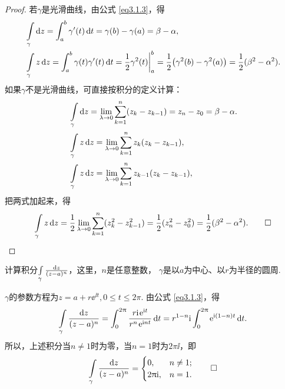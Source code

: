 \begin{proof}
  若$\gamma$是光滑曲线，由公式 \eqref{eq3.1.3}，得
  \begin{align*}
    & \int\limits_\gamma \mathop{}\!\mathrm dz = \int_a^b\gamma'(t)\mathop{}\!\mathrm{d} t=\gamma(b)-\gamma(a)=\beta-\alpha,\\
    & \int\limits_\gamma z\mathop{}\!\mathrm dz = \int_a^b\gamma(t)\gamma'(t)\mathop{}\!\mathrm{d} t
      = \frac12\gamma^2(t)\bigg|_a^b = \frac12\big(\gamma^2(b)-\gamma^2(a)\big)
      = \frac12(\beta^2-\alpha^2).
  \end{align*}
  如果$\gamma$不是光滑曲线，可直接按积分的定义计算：
  \begin{align*}
  &\int\limits_\gamma\mathop{}\!\mathrm dz=\lim_{\lambda\to0}\sum_{k=1}^n(z_k-z_{k-1})
  =z_n-z_0=\beta-\alpha.\\
  &\int\limits_\gamma z\mathop{}\!\mathrm dz=\lim_{\lambda\to0}\sum_{k=1}^nz_k(z_k-z_{k-1}),\\
  &\int\limits_\gamma z\mathop{}\!\mathrm dz=\lim_{\lambda\to0}\sum_{k=1}^nz_{k-1}(z_k-z_{k-1}),
  \end{align*}
  把两式加起来，得
  \begin{equation*}
    \int\limits_\gamma z\mathop{}\!\mathrm dz=\frac12\lim_{\lambda\to0}
    \sum_{k=1}^n(z_k^2-z_{k-1}^2)=\frac12(z_n^2-z_0^2)=\frac12(\beta^2-\alpha^2). \qedhere
  \end{equation*}
\end{proof}

\begin{example}\label{exam3.1.4}
  计算积分$\int\limits_\gamma\frac{\mathop{}\!\mathrm dz}{(z-a)^n}$，这里，$n$是任意整数，
$\gamma$是以$a$为中心、以$r$为半径的圆周.
\end{example}
\begin{solution}
  $\gamma$的参数方程为$z=a+r\ee^{\ii t},0\le t\le2\pi$. 由公式 \eqref{eq3.1.3}，得
  \[
    \int\limits_\gamma\frac{\dz}{(z-a)^n} = \int_0^{2\pi}\frac{r\ii\ee^{\ii t}}{r^n\ee^{\ii nt}}\dif t=r^{1-n}\ii\int_0^{2\pi}\ee^{\ii(1-n)t}\dif t.
  \]
  所以，上述积分当$n\ne1$时为零，当$n=1$时为$2\pi\ii$，即
  \begin{equation*}
    \int\limits_\gamma \frac{\mathop{}\!\mathrm dz}{(z-a)^n} =
    \begin{cases}
      0, & n \ne 1 ; \\
      2\uppi\mathrm i, & n = 1.
    \end{cases} \qedhere
  \end{equation*}
\end{solution}

